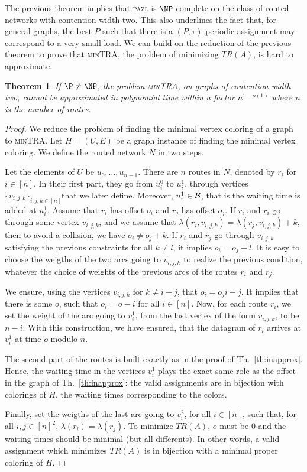 \documentclass[a4paper,10pt]{article}
\newtheorem{theorem}{Theorem}
\newcommand\pazl{\textsc{pazl}\xspace}
\newcommand\mintra{\textsc{minTRA}\xspace}
\begin{document}
The previous theorem implies that \pazl is $\NP$-complete on the class of routed networks with contention width two. This also underlines the fact that, for general graphs, the best $P$ such that there is a 
$(P,\tau)$-periodic assignment may correspond to a very small load. We can build on the reduction of the previous theorem to prove that \mintra, the problem of minimizing $TR(A)$, is hard to approximate.

\begin{theorem}
If $\P \neq \NP$, the problem \mintra, on graphs of contention width two, cannot be approximated in polynomial time within a factor $n^{1-o(1)}$ where $n$ is the number of routes.
\end{theorem}

\begin{proof}
We reduce the problem of finding the minimal vertex coloring of a graph to \mintra.
 Let $H = (U,E)$ be a graph instance of finding the minimal vertex coloring. 
 We define the routed network $N$ in two steps. 

 Let the elements of $U$ be $u_0,\dots, u_{n-1}$. There are $n$ routes in $N$, denoted by $r_i$ for $i \in [n]$. In their first part, they go from $u_i^0$ to $u_i^1$, through vertices $\{v_{i,j,k}\}_{i,j,k \in [n]}$that we later define. Moreover, $u_i^1 \in \cal{B}$, that is the waiting time is added at $u_i^1$. Assume that $r_i$ has offset $o_i$ and $r_j$ has offset $o_j$.
 If $r_i$ and $r_i$ go through some vertex $v_{i,j,k}$, and we assume that $\lambda(r_i,v_{i,j,k}) = \lambda(r_j,v_{i,j,k}) + k$, then to avoid a collision, we have $o_i \neq o_j + k$. If $r_i$ and $r_j$ go through $v_{i,j,k}$ satisfying the previous constraints for all $k \neq l$, it implies $o_i = o_j + l$. 
 It is easy to choose the weigths of the two arcs going to $v_{i,j,k}$ to realize the previous condition, whatever the choice of weights of the previous arcs of the routes $r_i$ and $r_j$.

We ensure, using the vertices $v_{i,j,k}$ for $k \neq i-j$,
that $o_{i} = o_{j} i - j$. It implies that there is some $o$, such that 
$o_{i} = o - i$ for all $i \in [n]$. Now, for each route $r_i$, we set the weight of the
arc going to $v_i^1$, from the last vertex of the form $v_{i,j,k}$, to be $n-i$.
With this construction, we have ensured, that the datagram of $r_i$ arrives at 
$v_i^1$ at time $o$ modulo $n$. 

The second part of the routes is built exactly as in the proof of Th.~\ref{th:inapprox}.
Hence, the waiting time in the vertices $v_i^1$ plays the exact same role as the offset
in the graph of Th.~\ref{th:inapprox}: the valid assignments are in bijection with colorings of $H$, the waiting times corresponding to the colors.

Finally, set the weigths of the last arc going to $v_i^2$, for all $i\in [n]$, such that, for all $i,j \in [n]^2$, $\lambda(r_i) = \lambda(r_j)$.  To minimize $TR(A)$, $o$ must be $0$ and the waiting times should be minimal (but all differents). In other words, a valid assignment which minimizes $TR(A)$ is in bijection with a minimal proper coloring of $H$.
\end{proof}
\end{document}
